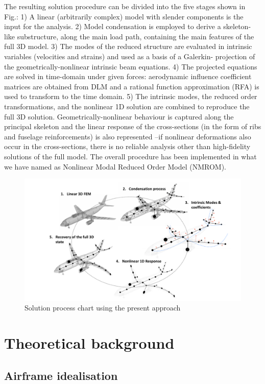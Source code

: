\documentclass[11pt]{article}
\begin{document}
The resulting solution procedure can be divided into the five stages shown in Fig.: 1) A
linear (arbitrarily complex) model with slender components is the input for the analysis. 2)
Model condensation is employed to derive a skeleton-like substructure, along the main load
path, containing the main features of the full 3D model. 3) The modes of the reduced structure
are evaluated in intrinsic variables (velocities and strains) and used as a basis of a Galerkin-
projection of the geometrically-nonlinear intrinsic beam equations. 4) The projected equations
are solved in time-domain under given forces: aerodynamic influence coefficient matrices are
obtained from DLM and a rational function approximation (RFA) is used to transform to the
time domain. 5) The intrinsic modes, the reduced order transformations, and the nonlinear 1D
solution are combined to reproduce the full 3D solution. Geometrically-nonlinear behaviour
is captured along the principal skeleton and the linear response of the cross-sections (in the
form of ribs and fuselage reinforcements) is also represented –if nonlinear deformations also
occur in the cross-sections, there is no reliable analysis other than high-fidelity solutions of the
full model. The overall procedure has been implemented in what we have named as Nonlinear
Modal Reduced Order Model (NMROM).
\begin{figure}[htbp]
\centering
\includegraphics[width=.9\linewidth]{./img/aircraft_process.pdf}
\caption{\label{fig:org4a19cf9}Solution process chart using the present approach}
\end{figure} 
\section{Theoretical background}
\label{sec:org068f350}

\subsection{Airframe idealisation}
\label{sec:org78ded7e}
\end{document}
